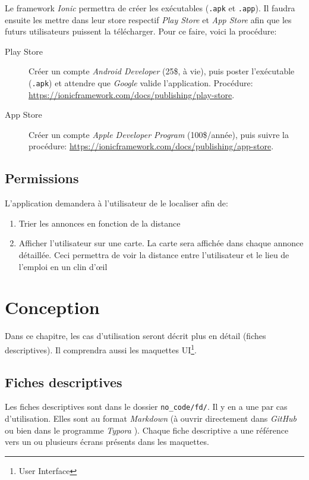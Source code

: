 \documentclass[french]{report}
\begin{document}
Le framework \textit{Ionic} permettra de créer les exécutables (\verb|.apk| et
\verb|.app|). Il faudra ensuite les mettre dans leur store respectif 
\textit{Play Store} et \textit{App Store} afin que les futurs utilisateurs puissent
la télécharger. Pour ce faire, voici la procédure:
\begin{description}
    \item[Play Store] Créer un compte \textit{Android Developer} (25\$, à vie), puis poster
    l'exécutable (\verb|.apk|) et attendre que \textit{Google} valide l'application.
    Procédure: \url{https://ionicframework.com/docs/publishing/play-store}.
    \item[App Store] Créer un compte \textit{Apple Developer Program} (100\$/année),
    puis suivre la procédure: \url{https://ionicframework.com/docs/publishing/app-store}.
\end{description}


\section{Permissions}
L'application demandera à l'utilisateur de le localiser afin de:
\begin{enumerate}
    \item Trier les annonces en fonction de la distance
    \item Afficher l'utilisateur sur une carte. La carte sera affichée dans chaque
    annonce détaillée. Ceci permettra de voir la distance entre l'utilisateur et le
    lieu de l'emploi en un clin d'\oe il
\end{enumerate}


\chapter{Conception}
Dans ce chapitre, les cas d'utilisation seront décrit plus en détail (fiches
descriptives). Il comprendra aussi les maquettes UI\footnote{User Interface}.

\section{Fiches descriptives}
Les fiches descriptives sont dans le dossier \verb|no_code/fd/|. Il y en a une par
cas d'utilisation. Elles sont au format \textit{Markdown} (à ouvrir directement dans
\textit{GitHub} ou bien dans le programme \textit{Typora }). Chaque fiche descriptive
a une référence vers un ou plusieurs écrans présents dans les maquettes.
\end{document}

